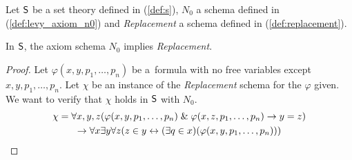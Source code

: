 Let $\sf{S}$ be a set theory defined in (\ref{def:s}), $N_0$ a schema defined in (\ref{def:levy_axiom_n0}) and \emph{Replacement} a schema defined in (\ref{def:replacement}).
\begin{theorem} 
In $\sf{S}$, the axiom schema $N_0$ implies \emph{Replacement}.
\end{theorem}
\begin{proof}
Let $\varphi(x, y, p_1, \ldots, p_n)$ be a~formula with no free variables except $x, y, p_1, \ldots, p_n$.
Let $\chi$ be an instance of the \emph{Replacement} schema for the $\varphi$ given. We want to verify that $\chi$ holds in $\sf{S}$ with $N_0$.
\begin{equation}
\begin{gathered}
\chi = \forall x, y, z(\varphi(x, y, p_1, \ldots, p_n) \mathrel{\&} \varphi(x, z, p_1, \ldots, p_n) \rightarrow y = z) \\
\rightarrow \forall x \exists y \forall z (z \in y \leftrightarrow (\exists q \in x)(\varphi(x, y, p_1, \ldots, p_n)))
\end{gathered}
\end{equation}


\end{proof}
